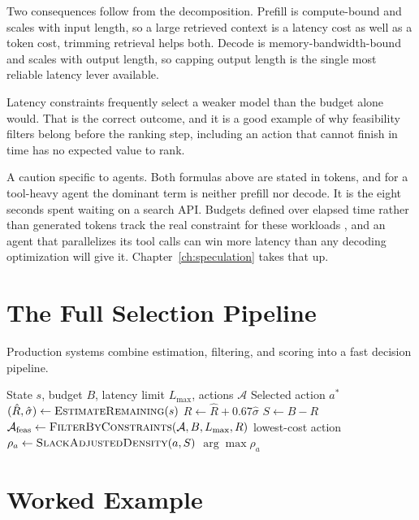 Two consequences follow from the decomposition. Prefill is compute-bound and
scales with input length, so a large retrieved context is a latency cost as well
as a token cost, trimming retrieval helps both. Decode is
memory-bandwidth-bound and scales with output length, so capping output length is
the single most reliable latency lever available.

Latency constraints frequently select a weaker model than the budget alone would.
That is the correct outcome, and it is a good example of why feasibility filters
belong before the ranking step, including an action that cannot finish in time has no
expected value to rank.

A caution specific to agents. Both formulas above are stated in tokens, and for a
tool-heavy agent the dominant term is neither prefill nor decode. It is the
eight seconds spent waiting on a search API. Budgets defined over elapsed time
rather than generated tokens track the real constraint for these workloads
\cite{timelymachine2026}, and an agent that parallelizes its tool calls can win
more latency than any decoding optimization will give it. Chapter~\ref{ch:speculation}
takes that up.

\section{The Full Selection Pipeline}

Production systems combine estimation, filtering, and scoring into a fast decision pipeline.

\begin{algorithm}
\caption{Budget-Aware Action Selection Pipeline}
\begin{algorithmic}[1]
\Require State $s$, budget $B$, latency limit $L_{\max}$, actions $\mathcal{A}$
\Ensure Selected action $a^*$
\State $(\hat{R}, \hat{\sigma}) \gets \textsc{EstimateRemaining}(s)$
\State $R \gets \hat{R} + 0.67 \hat{\sigma}$
\State $S \gets B - R$
\State $\mathcal{A}_{\text{feas}} \gets \textsc{FilterByConstraints}(\mathcal{A}, B, L_{\max}, R)$
    \State \Return lowest-cost action
\EndIf
{}
    \State $\rho_a \gets \textsc{SlackAdjustedDensity}(a, S)$
\EndFor
\State \Return $\arg\max \rho_a$
\end{algorithmic}
\end{algorithm}

\section{Worked Example}

